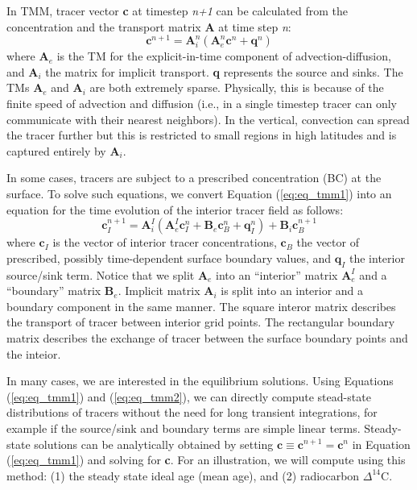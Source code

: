 \documentclass[a4paper]{article}
\begin{document}
In TMM, tracer vector \textbf{c} at timestep \textit{n+1} can be calculated from the concentration and the transport matrix \textbf{A} at time step \textit{n}:
\begin{equation}
   \mathbf{c}^{n+1}= \mathbf{A}_i^{n}(\mathbf{A}_e^{n}\mathbf{c}^{n} + \mathbf{q}^n)   \label{eq:eq_tmm1}
\end{equation}
where $\mathbf{A}_e$ is the TM for the explicit-in-time component of advection-diffusion, and $\mathbf{A}_i$ the matrix for implicit transport. \textbf{q} represents the source and sinks. The TMs $\mathbf{A}_e$ and $\mathbf{A}_i$ are both extremely sparse. Physically, this is because of the finite speed of advection and diffusion (i.e., in a single timestep tracer can only communicate with their nearest neighbors). In the vertical, convection can spread the tracer further but this is restricted to small regions in high latitudes and is captured entirely by $\mathbf{A}_i$. 

In some cases, tracers are subject to a prescribed concentration (BC) at the surface. To solve such equations, we convert Equation (\ref{eq:eq_tmm1}) into an equation for the time evolution of the interior tracer field as follows:
\begin{equation}
   \mathbf{c}_I^{n+1}= \mathbf{A}_i^{I}(\mathbf{A}_e^{I}\mathbf{c}_I^{n} + \mathbf{B}_e\mathbf{c}_B^{n} + \mathbf{q}_I^n) + \mathbf{B}_i\mathbf{c}_B^{n+1}   \label{eq:eq_tmm2}
\end{equation}
where $\mathbf{c}_I$ is the vector of interior tracer concentrations, $\mathbf{c}_B$ the vector of prescribed, possibly time-dependent surface boundary values, and $\mathbf{q}_I$ the interior source/sink term. Notice that we split $\mathbf{A}_e$ into an ``interior'' matrix $\mathbf{A}_e^{I}$ and a ``boundary'' matrix $\mathbf{B}_e$. Implicit matrix $\mathbf{A}_i$ is split into an interior and a boundary component in the same manner. The square interor matrix describes the transport of tracer between interior grid points. The rectangular boundary matrix describes the exchange of tracer between the surface boundary points and the inteior.

In many cases, we are interested in the equilibrium solutions. Using Equations (\ref{eq:eq_tmm1}) and (\ref{eq:eq_tmm2}), we can directly compute stead-state distributions of tracers without the need for long transient integrations, for example if the source/sink and boundary terms are simple linear terms. Steady-state solutions can be analytically obtained by setting  $\mathbf{c} \equiv \mathbf{c}^{n+1}=\mathbf{c}^{n}$ in Equation (\ref{eq:eq_tmm1}) and solving for \textbf{c}. For an illustration, we will compute using this method: (1) the steady state ideal age (mean age), and (2) radiocarbon $\Delta^{14}\mathrm{C}$. 
\end{document}
